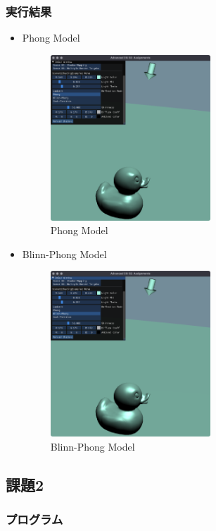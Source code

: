 \documentclass[a4paper,10pt,uplatex,dvipdfmx]{jsarticle}
\begin{document}
\subsubsection*{実行結果}
\begin{itemize}
  \item Phong Model
    \begin{figure}[H]
      \centering
      \includegraphics*[width=6cm]{./img/phong.png}
      \caption{Phong Model}
    \end{figure}
  \item Blinn-Phong Model
    \begin{figure}[H]
      \centering
      \includegraphics*[width=6cm]{./img/blinn-phong.png}
      \caption{Blinn-Phong Model}
    \end{figure}
\end{itemize}


\subsection*{課題2}
\subsubsection*{プログラム}




\end{document}
